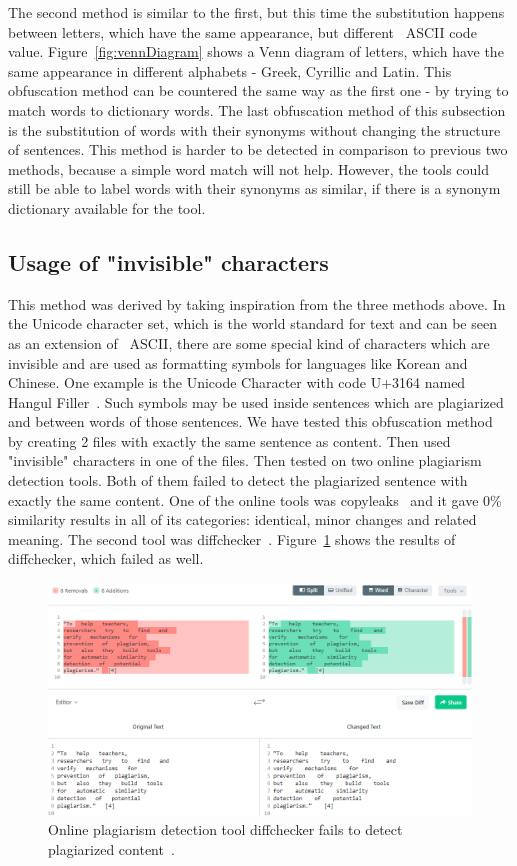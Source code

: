 \documentclass[12pt]{article}
\begin{document}
The second method is similar to the first, but this time the substitution happens between letters, which have the same appearance, but different ~\ac{ASCII} code value. Figure~\ref{fig:vennDiagram} shows a Venn diagram of letters, which have the same appearance in different alphabets - Greek, Cyrillic and Latin. This obfuscation method can be countered the same way as the first one - by trying to match words to dictionary words. The last obfuscation method of this subsection is the substitution of words with their synonyms without changing the structure of sentences. This method is harder to be detected in comparison to previous two methods, because a simple word match will not help. However, the tools could still be able to label words with their synonyms as similar, if there is a synonym dictionary available for the tool. 

\subsection{Usage of "invisible" characters} \label{sec:Usage of "invisible" characters}
This method was derived by taking inspiration from the three methods above. In the Unicode character set, which is the world standard for text and can be seen as an extension of ~\ac{ASCII}, there are some special kind of characters which are invisible and are used as formatting symbols for languages like Korean and Chinese. One example is the Unicode Character with code U+3164 named Hangul Filler~\cite{hangul}. Such symbols may be used inside sentences which are plagiarized and between words of those sentences. We have tested this obfuscation method by creating 2 files with exactly the same sentence as content. Then used "invisible" characters in one of the files. Then tested on two online plagiarism detection tools. Both of them failed to detect the plagiarized sentence with exactly the same content. One of the online tools was copyleaks~\cite{copyleaks} and it gave 0\% similarity results in all of its categories: identical, minor changes and related meaning. The second tool was diffchecker~\cite{diffchecker}. Figure~\ref{fig:diffChecker} shows the results of diffchecker, which failed as well.

\begin{figure} [ht]
    \centering
    \includegraphics[width=1.0\textwidth]{../images/DiffChecker2.png}
    \caption{Online plagiarism detection tool diffchecker fails to detect plagiarized content~\cite{diffchecker}.}
    \label{fig:diffChecker}
\end{figure}
\end{document}
